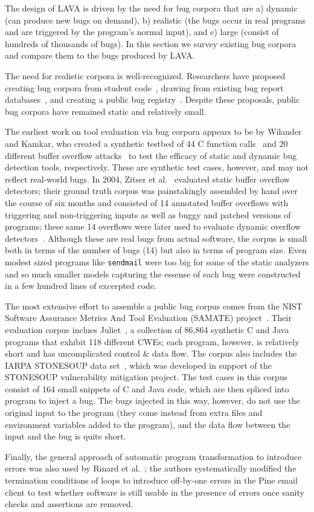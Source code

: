 The design of LAVA is driven by the need for bug corpora that are a) dynamic (can produce new bugs on demand), b) realistic (the bugs occur in real programs and are triggered by the program's normal input), and c) large (consist of hundreds of thousands of bugs). 
In this section we survey existing bug corpora and compare them to the bugs produced by LAVA.

The need for realistic corpora is well-recognized. 
Researchers have proposed creating bug corpora from student code~\cite{Spacco:2005}, drawing from existing bug report databases~\cite{Lu:2005,Meftah:2005},
and creating a public bug registry~\cite{Foster:2005}. 
Despite these proposals, public bug corpora have remained static and relatively small.

The earliest work on tool evaluation via bug corpora appears to be by Wilander and Kamkar, who created a synthetic testbed of 44 C function calls~\cite{Wilander:2002} and 20 different buffer overflow attacks~\cite{Wilander:2003} to test the efficacy of static and dynamic bug detection tools, respectively. 
These are synthetic test cases, however, and may not reflect real-world bugs. 
In 2004, Zitser et al.~\cite{Zitser:2004} evaluated static buffer overflow detectors; their ground truth corpus was painstakingly assembled by hand over the course of six months and consisted of 14 annotated buffer overflows with triggering and non-triggering inputs as well as buggy and patched versions of programs; these same 14 overflows were later used to evaluate dynamic overflow detectors~\cite{Zhivich:2005}.
Although these are real bugs from actual software, the corpus is small both in terms of the number of bugs (14) but also in terms of program size.
Even modest sized programs like \verb+sendmail+ were too big for some of the static analyzers and so much smaller models capturing the essense of  each bug were constructed in a few hundred lines of excerpted code.  

The most extensive effort to assemble a public bug corpus comes from the NIST Software Assurance Metrics And Tool Evaluation (SAMATE)
project~\cite{Kass:2005}. 
Their evaluation corpus inclues Juliet~\cite{Juliet:2012}, a collection of 86,864 synthetic C and Java programs that exhibit 118 different CWEs; each program, however, is relatively short and has uncomplicated control \& data flow. 
The corpus also includes the IARPA STONESOUP data set~\cite{SAMATE:2014}, which was developed in support of the STONESOUP vulnerability mitigation project.
The test cases in this corpus consist of 164 small snippets of C and Java code, which are then spliced into program to inject a bug. 
The bugs injected in this way, however, do not use the original input to the program (they come instead from extra files and environment variables added to the program), and the data flow between the input and the bug is quite short.

Finally, the general approach of automatic program transformation to introduce errors was also used by Rinard et al.~\cite{Rinard:2005}; the authors systematically modified the termination conditions of loops to introduce off-by-one errors in the Pine email client to test whether software is still usable in the presence of errors once sanity checks and assertions are removed.
